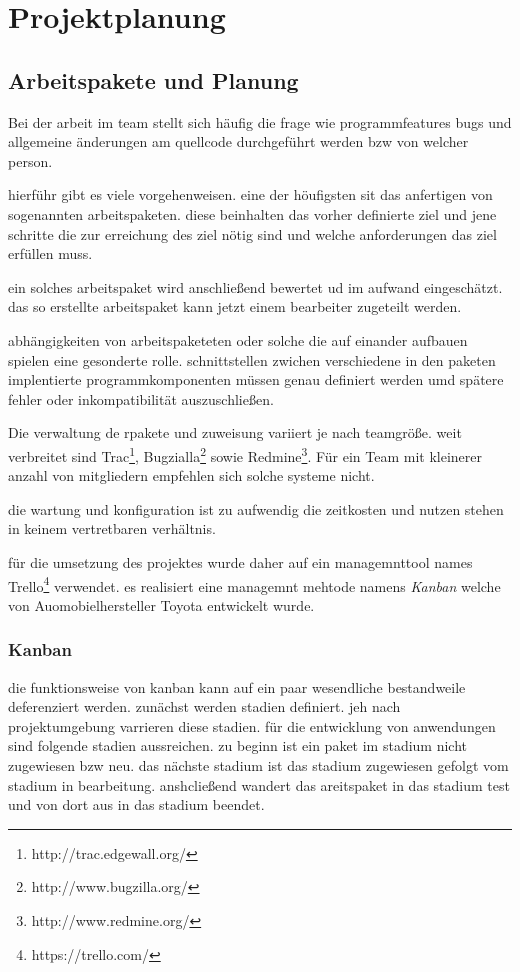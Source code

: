 \section{Projektplanung}
\label{proj}
\subsection{Arbeitspakete und Planung}
Bei der arbeit im team stellt sich häufig die frage wie programmfeatures bugs und allgemeine änderungen am quellcode durchgeführt werden bzw von welcher person.

hierführ gibt es viele vorgehenweisen. eine der höufigsten sit das anfertigen von sogenannten arbeitspaketen. diese beinhalten das vorher definierte ziel und jene schritte die zur erreichung des ziel nötig sind und welche anforderungen das ziel erfüllen muss.

ein solches arbeitspaket wird anschließend bewertet ud im aufwand eingeschätzt. das so erstellte arbeitspaket kann jetzt einem bearbeiter zugeteilt werden.

abhängigkeiten von arbeitspaketeten oder solche die auf einander aufbauen spielen eine gesonderte rolle. schnittstellen zwichen verschiedene in den paketen implentierte programmkomponenten müssen genau definiert werden umd spätere fehler oder inkompatibilität auszuschließen.

Die verwaltung de rpakete und zuweisung variiert je nach teamgröße. weit verbreitet sind Trac\footnote{http://trac.edgewall.org/}, Bugzialla\footnote{http://www.bugzilla.org/} sowie Redmine\footnote{http://www.redmine.org/}. Für ein Team mit kleinerer anzahl von mitgliedern empfehlen sich solche systeme nicht.

die wartung und konfiguration ist zu aufwendig die zeitkosten und nutzen stehen in keinem vertretbaren verhältnis.

für die umsetzung des projektes wurde daher auf ein managemnttool names Trello\footnote{https://trello.com/} verwendet. es realisiert eine managemnt mehtode namens \textit{Kanban} welche von Auomobielhersteller Toyota entwickelt wurde.

\subsubsection{Kanban}

die funktionsweise von kanban kann auf ein paar wesendliche bestandweile deferenziert werden. zunächst werden stadien definiert. jeh nach projektumgebung varrieren diese stadien. für die entwicklung von anwendungen sind folgende stadien aussreichen. zu beginn ist ein paket im stadium nicht zugewiesen bzw neu. das nächste stadium ist das stadium zugewiesen gefolgt vom stadium in bearbeitung. anshcließend wandert das areitspaket in das stadium test und von dort aus in das stadium beendet.

